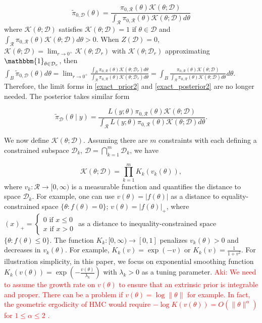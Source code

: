 \documentclass[10pt]{article}
\newcommand{\aki}[1]{\textcolor{red}{Aki: #1}}
\newcommand{\mc}[1]{\mathcal{#1}}
\DeclareMathOperator{\1}{\mathbbm{1}}
\begin{document}
\begin{equation}
\label{extrinsic_prior}
	\tilde{\pi}_{0,\mc D}(\theta) = \frac{ \pi_{0,\mc R}(\theta) \mc{K}( \theta; \mc D) }{ \int_{\mc R} \pi_{0,\mc R}(\theta) \mc{K}(\theta; \mc D)d\theta }
\end{equation}
where $\mc K(\theta; \mc D)$ satisfies $\mc K(\theta; \mc D)=1$ if $\theta\in \mc D$ and $ \int_{\mc R} \pi_{0,\mc R}(\theta) \mc{K}(\theta; \mc D)d\theta>0$. When $Z(\mc D)=0$, $\mc K(\theta;  \mc D)=\lim_{r\rightarrow 0^+}\mc K(\theta;  \mc D_r)$ with $\mc{K}(\theta; \mc D_r)$ approximating $\mathbbm{1}_{\theta\in  \mc D_r}$, then $
	\int_{B} \tilde{\pi}_{0,\mc D}(\theta) d \theta =  \lim_{r\rightarrow 0^+}\frac{\int_{B}  \pi_{0,\mc R}(\theta) \mc{K}( \theta; \mc D_r)d\theta }{ \int_{\mc R} \pi_{0,\mc R}(\theta) \mc{K}(\theta; \mc D_r)d\theta } = 	\int_{B} \frac{ \pi_{0,\mc R}(\theta) \mc{K}( \theta; \mc D) }{ \int_{\mc R} \pi_{0,\mc R}(\theta) \mc{K}(\theta; \mc D)d\theta } d\theta$. Therefore, the limit forms in \eqref{exact_prior2} and \eqref{exact_posterior2} are no longer needed. The posterior takes similar form

\begin{equation}
\label{extrinsic_posterior}
	\tilde{\pi}_{\mc D}(\theta \mid y) = \frac{ L(y;\theta)\pi_{0,\mc R}(\theta) \mc{K}( \theta; \mc D) }{ \int_{\mc R} L(y;\theta)\pi_{0,\mc R}(\theta) \mc{K}(\theta; \mc D)d\theta }.
\end{equation}

We now define $\mc K(\theta;\mc D)$. Assuming there are $m$ constraints with each defining a constrained subspace $\mc D_k$, $\mc D = \bigcap_{k=1}^m\mc D_k$, we have

\begin{equation}
\label{smoothing}
\mc K(\theta; \mc D)= \prod_{k=1}^m K_k(v_k(\theta)),
\end{equation}
where $v_k: \mc R \rightarrow [0,\infty)$ is a measurable function and quantifies the distance to space $\mc D_k$. For example, one can use $v(\theta)=|f(\theta)|$ as a distance to equality-constrained space  $\{\theta:f(\theta)=0\}$; $v(\theta)=|f(\theta)|_+$, where $(x)_+ = \left\{\begin{array}{cc}  0 \text{ if } x\le 0 \\ x \text{ if } x> 0\end{array}\right.$ as a distance to inequality-constrained space  $\{\theta:f(\theta) \le 0\}$. The function $K_k:[0,\infty)\rightarrow [0,1]$ penalizes $v_k(\theta)>0$ and decreases in $v_k(\theta)$. For example, $K_k(v)=\exp(-v)$ or $K_k(v)=\frac{1}{1+v^2}$. For illustration simplicity, in this paper, we focus on exponential smoothing function $K_k(v(\theta))=\exp(-\frac{v(\theta)}{\lambda_k})$ with $\lambda_k>0$ as a tuning parameter. \aki{We need to assume the growth rate on $v(\theta)$ to ensure that an extrinsic prior is integrable and proper. There can be a problem if $v(\theta) = \log \| \theta \|$ for example. In fact, the geometric ergodicity of HMC would require $- \log K(v(\theta)) = O(\| \theta \|^\alpha)$ for $1 \leq \alpha \leq 2$ \citep{livingstone2016geometric}.}
\end{document}
